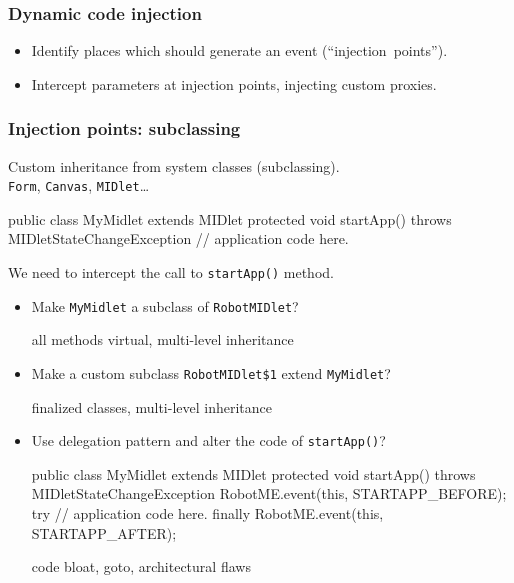 \documentclass[compress]{beamer}
\begin{document}
\begin{frame}
    \frametitle{Dynamic code injection}

	\begin{itemize}
        \item Identify places which should generate an event (``injection~points'').
        \item Intercept parameters at injection points, injecting custom proxies.
	\end{itemize}
\end{frame}

\begin{frame}[fragile]
    \frametitle{Injection points: subclassing}

    Custom inheritance from system classes (subclassing).\\
    \texttt{Form}, \texttt{Canvas}, \texttt{MIDlet}\ldots{} 
    \begin{javablock}
public class MyMidlet extends MIDlet {
    protected void startApp() throws MIDletStateChangeException {
        // application code here.
    }
}
    \end{javablock}

    \bigskip
    We need to intercept the call to \texttt{startApp()} method.
\end{frame}

\begin{frame}[fragile]
    \begin{itemize}
        \item Make \texttt{MyMidlet} a subclass of \texttt{RobotMIDlet}?
        \begin{javablock}
public class MyMidlet extends RobotMIDlet {
        \end{javablock}
        {\tiny all methods virtual, multi-level inheritance}

        \pause
        \item Make a custom subclass \texttt{RobotMIDlet\$1} extend \texttt{MyMidlet}?
        \begin{javablock}
public class RobotMIDlet$1 extends MyMidlet {
        \end{javablock}
        {\tiny finalized classes, multi-level inheritance}

        \pause
        \item Use delegation pattern and alter the code of \texttt{startApp()}?
    \begin{javablock}
public class MyMidlet extends MIDlet {
    protected void startApp() throws MIDletStateChangeException {
        RobotME.event(this, STARTAPP_BEFORE);
        try {
            // application code here.
        } finally {
            RobotME.event(this, STARTAPP_AFTER);
        }
    }
}
    \end{javablock}
    {\tiny code bloat, goto, architectural flaws}
    \end{itemize}
\end{frame}
\end{document}
